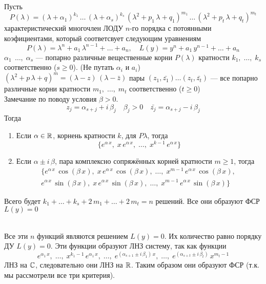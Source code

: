 \begin{Th}
    Пусть 
    \[
        P(\lambda) = (\lambda + \alpha_1)^{k_1}\,\dots\,(\lambda + \alpha_s)^{k_s}\,(\lambda^2 + p_1\,\lambda + q_1)^{m_1}\,\dots\,(\lambda^2 + p_t\,\lambda + q_t)^{m_t}
    \]
    характеристический многочлен ЛОДУ $n$-го порядка с потоянными коэфициентами, который соответсвует следующим уравнениям
    \[
        P(\lambda) = \lambda^n + a_1\,\lambda^{n-1} + \dots + a_n, \quad L(y) = y^n + a_1\,y^{n-1} + \dots + a_n
    \]
    $\alpha_1\,\; \dots,\; \alpha_s$ --- попарно различные вещественные корни $P(\lambda)$ кратности $k_1,\; \dots,\; k_s$ соответственно ($s \geqslant 0$). (Не путать $\alpha_i$ и $a_i$)\\
    $(\lambda^2 + p\,\lambda + q)^m = (\lambda - z)\,(\lambda - \bar{z})$ пары $(z_1, \bar{z_1})\dots(z_t, \bar{z_t})$ --- все попарно различные корни кратности $m_1,\; \dots,\; m_t$ соответственно ($t \geqslant 0$)\\
    
    Замечание по поводу условия $\beta > 0$.
    \[
        z_j = \alpha_{s + j} + i\,\beta_{j} \quad \beta_{j} > 0 \quad \bar{z_j} = \alpha_{s + j} - i\,\beta_{j}
    \]
    Тогда
    \begin{enumerate}
        \item Если $\alpha \in \mathbb{R}$, корнень кратности $k$, для $P{\lambda}$, тогда
        \[
        \{e^{\alpha\,x},\; x\,e^{\alpha\,x},\; \dots,\; x^{k-1}\,e^{\alpha\,x}\}
        \]
        
        \item Если $\alpha \pm i\,\beta$, пара комплексно сопряжённых корней кратности $m \geqslant 1$, тогда
        \begin{gather*}
        \{e^{\alpha\, x}\,\cos(\beta\,x),\; x\,e^{\alpha\, x}\,\cos(\beta\,x),\; \dots,\; x^{m-1}\,e^{\alpha\, x}\,\cos(\beta\,x),\;\\
        e^{\alpha\, x}\,\sin(\beta\,x),\; x\,e^{\alpha\, x}\,\sin(\beta\,x),\; \dots,\; x^{m-1}\,e^{\alpha\, x}\,\sin(\beta\,x)\}
        \end{gather*}
    \end{enumerate} 
    Всего будет $k_1 + \dots + k_s + 2\,m_1 + \dots + 2\,m_t = n$ решений. Все они образуют ФСР $L(y) = 0$    
\end{Th}

\begin{Proof}~\\
    Все эти $n$ функций являются решением $L(y) = 0$. Их количество равно порядку ДУ $L(y) = 0$. Эти функции образуют ЛНЗ систему, так как функции
    \[
        e^{\alpha_1\,x},\; \dots,\; x^{k_1 - 1}\,e^{\alpha_1\,x},\; \dots,\; e^{(\alpha_{s+1} \pm i\,\beta_1)\,x},\; \dots,\; e^{(\alpha_{s+t} \pm i\,\beta_t)}\,x^{m_t-1}
    \]
    ЛНЗ на $\mathbb{C}$, следовательно они ЛНЗ на $\mathbb{R}$. Таким образом они образуют ФСР (т.к. мы рассмотрели все три критерия).
\end{Proof}

